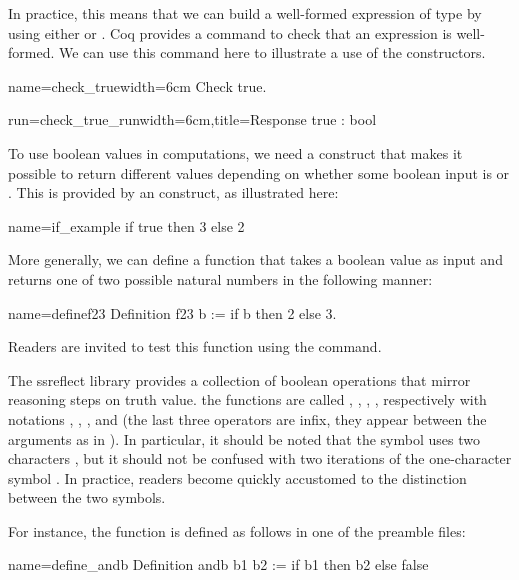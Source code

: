 In practice, this means that we can build a well-formed expression of
type  by using either  or .  Coq provides a
command to check that an expression is well-formed.  We can use this
command here to illustrate a use of the constructors.

\begin{coq}{name=check_true}{width=6cm}
Check true.
\end{coq}
\begin{coqout}{run=check_true_run}{width=6cm,title=Response}
true : bool
\end{coqout}

To use boolean values in computations, we need a construct that makes
it possible to return different values depending on whether some
boolean input is  or .  This is provided by an  construct, as illustrated here:

\begin{coq}{name=if_example}{}
 if true then 3 else 2
\end{coq}
More generally, we can define a function that takes a boolean value as
input and returns one of two possible natural numbers in the following
manner:

\begin{coq}{name=definef23}{}
Definition f23 b := if b then 2 else 3.
\end{coq}
Readers are invited to test this function using the  command.

The ssreflect library provides a collection of boolean operations that
mirror reasoning steps on truth value.  the functions are called
, ,  , , respectively with notations
\C{\~\~},  \C{||}, \C{&&}, and \C{==>} (the last three operators are
infix, they appear between the arguments as in ).
  In
particular, it should be
noted that the symbol \C{\~\~} uses two characters \C{\~}, but it should
not be confused with two iterations of the one-character symbol
\C{\~}.  In practice, readers become quickly accustomed to the
distinction between the two symbols.

For instance, the function  is defined as follows in one of
the preamble files:

\begin{coq}{name=define_andb}{}
Definition andb b1 b2 := if b1 then b2 else false
\end{coq}

